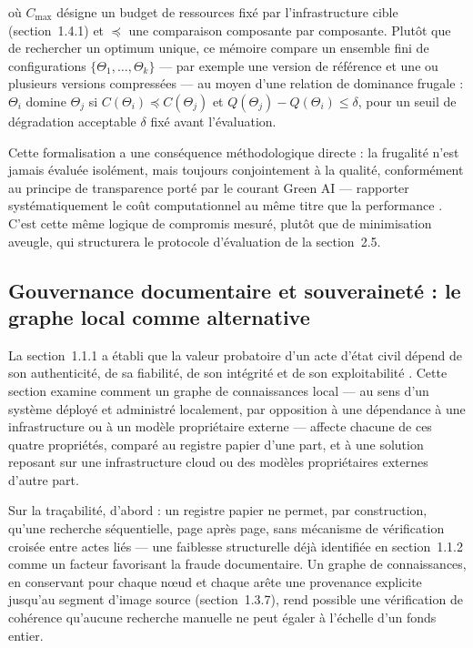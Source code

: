 où $C_{\max}$ désigne un budget de ressources fixé par l'infrastructure cible (section~1.4.1) et $\preceq$ une comparaison composante par composante. Plutôt que de rechercher un optimum unique, ce mémoire compare un ensemble fini de configurations $\{\Theta_1, \dots, \Theta_k\}$ --- par exemple une version de référence et une ou plusieurs versions compressées --- au moyen d'une relation de dominance frugale : $\Theta_i$ domine $\Theta_j$ si $C(\Theta_i) \preceq C(\Theta_j)$ et $Q(\Theta_j) - Q(\Theta_i) \leq \delta$, pour un seuil de dégradation acceptable $\delta$ fixé avant l'évaluation.

Cette formalisation a une conséquence méthodologique directe : la frugalité n'est jamais évaluée isolément, mais toujours conjointement à la qualité, conformément au principe de transparence porté par le courant \og Green AI \fg{} --- rapporter systématiquement le coût computationnel au même titre que la performance \cite{schwartz2020greenai}.
C'est cette même logique de compromis mesuré, plutôt que de minimisation aveugle, qui structurera le protocole d'évaluation de la section~2.5.

\subsection{Gouvernance documentaire et souveraineté : le graphe local comme alternative}

La section~1.1.1 a établi que la valeur probatoire d'un acte d'état civil dépend de son authenticité, de sa fiabilité, de son intégrité et de son exploitabilité \cite{ica2008module2}.
Cette section examine comment un graphe de connaissances local --- au sens d'un système déployé et administré localement, par opposition à une dépendance à une infrastructure ou à un modèle propriétaire externe --- affecte chacune de ces quatre propriétés, comparé au registre papier d'une part, et à une solution reposant sur une infrastructure cloud ou des modèles propriétaires externes d'autre part.

Sur la traçabilité, d'abord : un registre papier ne permet, par construction, qu'une recherche séquentielle, page après page, sans mécanisme de vérification croisée entre actes liés --- une faiblesse structurelle déjà identifiée en section~1.1.2 comme un facteur favorisant la fraude documentaire.
Un graphe de connaissances, en conservant pour chaque nœud et chaque arête une provenance explicite jusqu'au segment d'image source (section~1.3.7), rend possible une vérification de cohérence qu'aucune recherche manuelle ne peut égaler à l'échelle d'un fonds entier.

